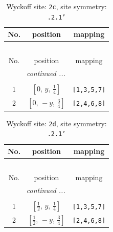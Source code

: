 \documentclass[fleqn,8pt]{jsarticle}
\begin{document}
\begin{longtable}{ccc}
\caption{Wyckoff site: {\tt 2c}, site symmetry: {\tt .2.1'}}
 \\
 \hline \hline
No. & position & mapping \\ \hline \endfirsthead

\multicolumn{2}{l}{\tablename\ \thetable{}} \\
 \hline \hline
No. & position & mapping \\ \hline \endhead

 \hline \hline
\multicolumn{2}{r}{\footnotesize\it continued ...} \\ \endfoot

 \hline \hline
\multicolumn{2}{r}{} \\ \endlastfoot

1 & $\left[ 0,\, y,\, \frac{1}{4} \right]$ & {\tt [1,3,5,7]} \\ \hline
2 & $\left[ 0,\, - y,\, \frac{3}{4} \right]$ & {\tt [2,4,6,8]} \\
\end{longtable}
\renewcommand{\arraystretch}{1.2}
\begin{longtable}{ccc}
\caption{Wyckoff site: {\tt 2d}, site symmetry: {\tt .2.1'}}
 \\
 \hline \hline
No. & position & mapping \\ \hline \endfirsthead

\multicolumn{2}{l}{\tablename\ \thetable{}} \\
 \hline \hline
No. & position & mapping \\ \hline \endhead

 \hline \hline
\multicolumn{2}{r}{\footnotesize\it continued ...} \\ \endfoot

 \hline \hline
\multicolumn{2}{r}{} \\ \endlastfoot

1 & $\left[ \frac{1}{2},\, y,\, \frac{1}{4} \right]$ & {\tt [1,3,5,7]} \\ \hline
2 & $\left[ \frac{1}{2},\, - y,\, \frac{3}{4} \right]$ & {\tt [2,4,6,8]} \\
\end{longtable}
\renewcommand{\arraystretch}{1.2}
\end{document}

